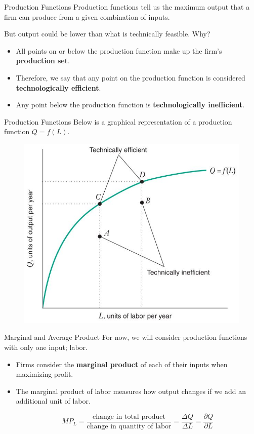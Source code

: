 \documentclass[11pt,t]{beamer}
\begin{document}
\begin{frame}{Production Functions}
  Production functions tell us the maximum output that a firm can produce from a given combination of inputs.
  
  \bigskip
  But output could be lower than what is technically feasible. Why?
  
  \bigskip\pause
  \begin{itemize}

    \item All points on or below the production function make up the firm's \textbf{production set}.

    \item Therefore, we say that any point on the production function is considered \textbf{technologically efficient}.

    \item Any point below the production function is \textbf{technologically inefficient}. 
  \end{itemize}
\end{frame}

\begin{frame}{Production Functions}
  Below is a graphical representation of a production function $Q=f(L)$.

  \begin{figure}
    \includegraphics[width=0.7\linewidth]{figures/fig6_1.jpg}
  \end{figure}
\end{frame}

\begin{frame}{Marginal and Average Product}
  For now, we will consider production functions with only one input; labor.
  
  \bigskip
  \begin{itemize}
    \item Firms consider the \textbf{marginal product} of each of their inputs when maximizing profit.

    \item The marginal product of labor measures how output changes if we add an additional unit of labor.

    \begin{equation*}
      MP_L =\frac{\text{change in total product}}{\text{change in quantity of labor}}= \frac{\Delta Q}{\Delta L} = \frac{\partial Q}{\partial L}
    \end{equation*}
  \end{itemize}
\end{frame}
\end{document}
